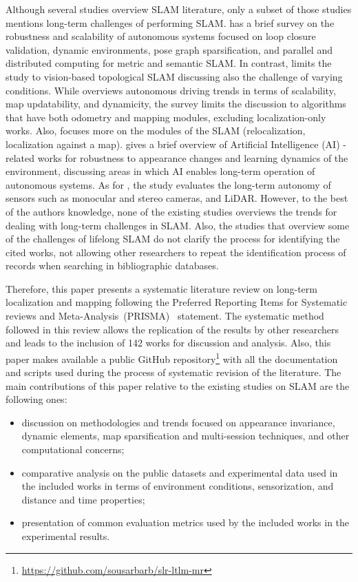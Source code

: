 Although several studies overview SLAM literature, only a subset of those studies mentions long-term challenges of performing SLAM.
\cite{purpose:study:cadena:2016} has a brief survey on the robustness and scalability of autonomous systems focused on loop closure validation, dynamic environments, pose graph sparsification, and parallel and distributed computing for metric and semantic SLAM.
In contrast, \cite{purpose:study:lowry:2016} limits the study to vision-based topological SLAM discussing also the challenge of varying conditions.
While \cite{purpose:study:bresson:2017} overviews autonomous driving trends in terms of scalability, map updatability, and dynamicity, the survey limits the discussion to algorithms that have both odometry and mapping modules, excluding localization-only works. Also, \cite{purpose:study:bresson:2017} focuses more on the modules of the SLAM (relocalization, localization against a map).
\cite{purpose:study:kunze:2018} gives a brief overview of Artificial Intelligence (AI) -related works for robustness to appearance changes and learning dynamics of the environment, discussing areas in which AI enables long-term operation of autonomous systems.
As for \cite{purpose:study:zaffar:2018}, the study evaluates the long-term autonomy of sensors such as monocular and stereo cameras, and LiDAR.
However, to the best of the authors knowledge, none of the existing studies overviews the trends for dealing with long-term challenges in SLAM. Also, the studies that overview some of the challenges of lifelong SLAM do not clarify the process for identifying the cited works, not allowing other researchers to repeat the identification process of records when searching in bibliographic databases.

Therefore, this paper presents a systematic literature review on long-term localization and mapping following the Preferred Reporting Items for Systematic reviews and Meta-Analysis~(PRISMA)~\parencite{methodology:prisma} statement.
The systematic method followed in this review allows the replication of the results by other researchers and leads to the inclusion of 142 works for discussion and analysis.
Also, this paper makes available a public GitHub repository\footnote{\url{https://github.com/sousarbarb/slr-ltlm-mr}} with all the documentation and scripts used during the process of systematic revision of the literature.
The main contributions of this paper relative to the existing studies on SLAM are the following ones:

\begin{itemize}[nosep]
\item discussion on methodologies and trends focused on appearance invariance, dynamic elements, map sparsification and multi-session techniques, and other computational concerns;
\item comparative analysis on the public datasets and experimental data used in the included works in terms of environment conditions, sensorization, and distance and time properties;
\item presentation of common evaluation metrics used by the included works in the experimental results.
\end{itemize}

